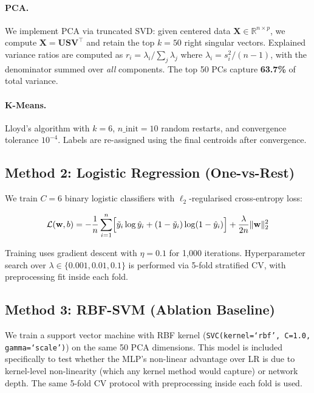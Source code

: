 \documentclass[11pt,letterpaper]{article}
\begin{document}
\paragraph{PCA.}
We implement PCA via truncated SVD: given centered data
$\mathbf{X} \in \mathbb{R}^{n \times p}$, we compute
$\mathbf{X} = \mathbf{U}\mathbf{S}\mathbf{V}^\top$ and retain the top $k=50$
right singular vectors.  Explained variance ratios are computed as
$r_i = \lambda_i / \sum_j \lambda_j$ where $\lambda_i = s_i^2 / (n-1)$, with
the denominator summed over \emph{all} components.  The top 50 PCs capture
\textbf{63.7\%} of total variance.

\paragraph{K-Means.}
Lloyd's algorithm with $k{=}6$, $n\_\text{init}{=}10$ random restarts, and
convergence tolerance $10^{-4}$.  Labels are re-assigned using the final
centroids after convergence.

\subsection{Method 2: Logistic Regression (One-vs-Rest)}

We train $C=6$ binary logistic classifiers with $\ell_2$-regularised
cross-entropy loss:

\begin{equation}
  \mathcal{L}(\mathbf{w}, b) =
    -\frac{1}{n}\sum_{i=1}^n \Bigl[\tilde{y}_i \log \hat{y}_i +
      (1-\tilde{y}_i)\log(1-\hat{y}_i)\Bigr]
    + \frac{\lambda}{2n} \|\mathbf{w}\|_2^2
\end{equation}

Training uses gradient descent with $\eta{=}0.1$ for 1,000 iterations.
Hyperparameter search over $\lambda \in \{0.001, 0.01, 0.1\}$ is performed via
5-fold stratified CV, with preprocessing fit inside each fold.

\subsection{Method 3: RBF-SVM (Ablation Baseline)}

We train a support vector machine with RBF kernel
(\texttt{SVC(kernel=`rbf', C=1.0, gamma=`scale')}) on the same 50 PCA
dimensions.  This model is included specifically to test whether the MLP's
non-linear advantage over LR is due to kernel-level non-linearity (which any
kernel method would capture) or network depth.  The same 5-fold CV protocol
with preprocessing inside each fold is used.
\end{document}
